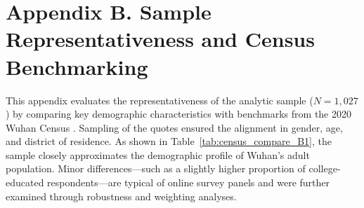 \section*{Appendix B. Sample Representativeness and Census Benchmarking}
\label{app:B}
\doublespacing

This appendix evaluates the representativeness of the analytic sample ($N = 1{,}027$) by 
comparing key demographic characteristics with benchmarks from the 2020 Wuhan Census \cite{WuhanStats2021}.
Sampling of the quotes ensured the alignment in gender, age, and district of residence. As shown in 
Table~\ref{tab:census_compare_B1}, the sample closely approximates the demographic profile 
of Wuhan’s adult population. Minor differences—such as a slightly higher proportion of 
college-educated respondents—are typical of online survey panels and were further examined 
through robustness and weighting analyses.

